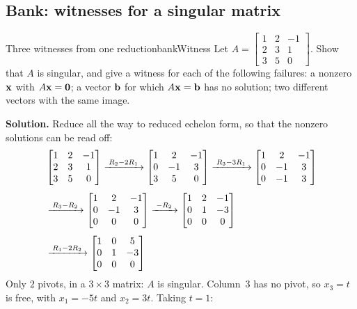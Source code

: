 \documentclass[11pt]{article}
\begin{document}
\subsection*{Bank: witnesses for a singular matrix}

\begin{exmp}{Three witnesses from one reduction}{bankWitness}
Let $A=\begin{bmatrix}1&2&-1\\2&3&1\\3&5&0\end{bmatrix}$. Show that $A$ is singular, and give a witness for each of the following failures: a nonzero $\mathbf{x}$ with $A\mathbf{x}=\mathbf{0}$; a vector $\mathbf{b}$ for which $A\mathbf{x}=\mathbf{b}$ has no solution; two different vectors with the same image.

\textbf{Solution.} Reduce all the way to reduced echelon form, so that the nonzero solutions can be read off:
\begin{align*}
&\begin{bmatrix}1&2&-1\\2&3&1\\3&5&0\end{bmatrix}
\xrightarrow{\;R_2-2R_1\;}
\begin{bmatrix}1&2&-1\\0&-1&3\\3&5&0\end{bmatrix}
\xrightarrow{\;R_3-3R_1\;}
\begin{bmatrix}1&2&-1\\0&-1&3\\0&-1&3\end{bmatrix}\\[4pt]
&\xrightarrow{\;R_3-R_2\;}
\begin{bmatrix}1&2&-1\\0&-1&3\\0&0&0\end{bmatrix}
\xrightarrow{\;-R_2\;}
\begin{bmatrix}1&2&-1\\0&1&-3\\0&0&0\end{bmatrix}\\[4pt]
&\xrightarrow{\;R_1-2R_2\;}
\begin{bmatrix}1&0&5\\0&1&-3\\0&0&0\end{bmatrix}
\end{align*}
Only $2$ pivots, in a $3\times3$ matrix: $A$ is singular. Column~$3$ has no pivot, so $x_3=t$ is free, with $x_1=-5t$ and $x_2=3t$. Taking $t=1$:


\end{exmp}
\end{document}
